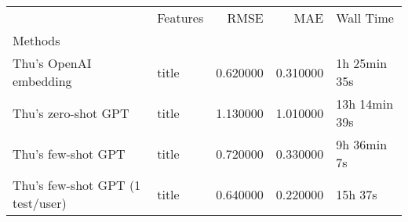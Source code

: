 \begin{tabular}{llrrl}
 & Features & RMSE & MAE & Wall Time \\
Methods &  &  &  &  \\
Thu's OpenAI embedding & title & 0.620000 & 0.310000 & 1h 25min 35s \\
Thu's zero-shot GPT & title & 1.130000 & 1.010000 & 13h 14min 39s \\
Thu's few-shot GPT & title & 0.720000 & 0.330000 & 9h 36min 7s \\
Thu's few-shot GPT (1 test/user) & title & 0.640000 & 0.220000 & 15h 37s \\
\end{tabular}
